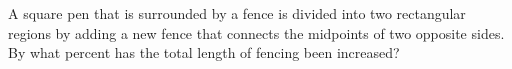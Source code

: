 A square pen that is surrounded by a fence is divided into two rectangular regions by adding a new fence that connects the midpoints of two opposite sides. By what percent has the total length of fencing been increased?

